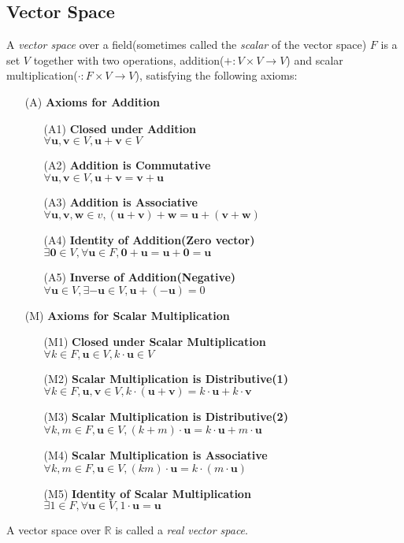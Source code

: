 \documentclass{report}
\begin{document}
		\subsection{Vector Space}\label{chap_vector_space}
		\begin{defn}
			A \emph{vector space} over a field(sometimes called the \emph{scalar} of the vector space) $F$ is a set $V$ together with two operations, addition($+:V\times V \rightarrow V$) and scalar multiplication($\cdot:F \times V \rightarrow V$), satisfying the following axioms:
			\begin{itemize}
				\item[(A)] \textbf{Axioms for Addition}
				\begin{itemize}
					\item[(A1)] \textbf{Closed under Addition}\\$\forall \bm{u} ,\bm{v} \in V, \bm{u}+\bm{v} \in V$
					\item[(A2)] \textbf{Addition is Commutative}\\$\forall \bm{u}, \bm{v} \in V, \bm{u}+\bm{v}=\bm{v}+\bm{u}$
					\item[(A3)] \textbf{Addition is Associative}\\$\forall \bm{u},\bm{v},\bm{w} \in v, (\bm{u}+\bm{v})+\bm{w}=\bm{u}+(\bm{v}+\bm{w})$
					\item[(A4)] \textbf{Identity of Addition(Zero vector)}\\$\exists \bm{0} \in V, \forall \bm{u} \in F, \bm{0}+\bm{u}=\bm{u}+\bm{0}=\bm{u}$
					\item[(A5)] \textbf{Inverse of Addition(Negative)}\\$\forall \bm{u} \in V, \exists -\bm{u} \in V, \bm{u}+(-\bm{u})=0$
				\end{itemize}
				\item[(M)] \textbf{Axioms for Scalar Multiplication}
				\begin{itemize}
					\item[(M1)] \textbf{Closed under Scalar Multiplication}\\$\forall k \in F, \bm{u} \in V, k \cdot \bm{u} \in V$
					\item[(M2)] \textbf{Scalar Multiplication is Distributive(1)}\\$\forall k \in F, \bm{u}, \bm{v} \in V, k \cdot (\bm{u}+\bm{v})=k \cdot \bm{u} + k \cdot \bm{v}$
					\item[(M3)] \textbf{Scalar Multiplication is Distributive(2)}\\$\forall k, m \in F, \bm{u} \in V, (k+m) \cdot \bm{u}=k \cdot \bm{u} + m \cdot \bm{u}$
					\item[(M4)] \textbf{Scalar Multiplication is Associative}\\$\forall k, m \in F, \bm{u} \in V, (km) \cdot \bm{u}=k \cdot (m \cdot \bm{u})$
					\item[(M5)] \textbf{Identity of Scalar Multiplication}\\$\exists 1 \in F, \forall \bm{u} \in V, 1 \cdot \bm{u}=\bm{u}$
				\end{itemize}
			\end{itemize}
			A vector space over $\mathbb{R}$ is called a \emph{real vector space}.
		\end{defn}
	
\end{document}
